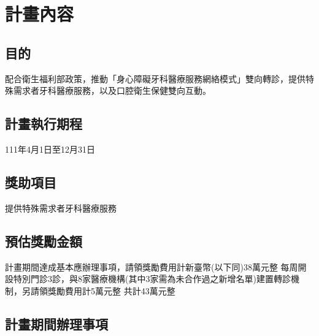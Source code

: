 \section{計畫內容}

\subsection{目的}
配合衛生福利部政策，推動「身心障礙牙科醫療服務網絡模式」雙向轉診，提供特殊需求者牙科醫療服務，以及口腔衛生保健雙向互動。


\subsection{計畫執行期程}
111年4月1日至12月31日

\subsection{獎助項目}
提供特殊需求者牙科醫療服務

\subsection{預估獎勵金額}
\begin{outline}
\1 計畫期間達成基本應辦理事項，請領獎勵費用計新臺幣(以下同)38萬元整
\1 每周開設特別門診3診，與8家醫療機構(其中3家需為未合作過之新增名單)建置轉診機制，另請領獎勵費用計5萬元整
\1 共計43萬元整
\end{outline}

\subsection{計畫期間辦理事項}

